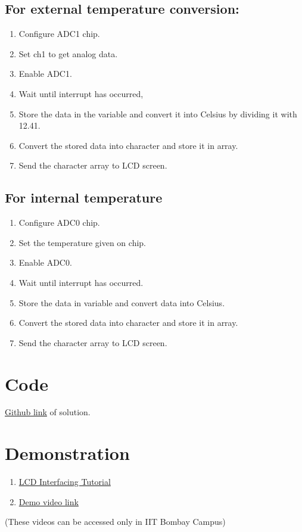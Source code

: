 \documentclass[a4paper,12pt,oneside]{book}
\begin{document}
\subsection{For external temperature conversion:}
\begin{enumerate}
\item Configure ADC1 chip.
\item Set ch1 to get analog data.
\item Enable ADC1. 
\item Wait until interrupt has occurred,
\item Store the data in the variable and convert it into Celsius by dividing it with 12.41.
\item Convert the stored data into character and store it in array.
\item Send the character array to LCD screen.
\end{enumerate}

\subsection{For internal temperature}
\begin{enumerate}
\item Configure ADC0 chip.
\item Set the temperature given on chip.
\item Enable ADC0.
\item Wait until interrupt has occurred.
\item Store the data in variable and convert data into Celsius.
\item Convert the stored data into character and store it in array.
\item Send the character array to LCD screen.
\end{enumerate}



\section{Code}
\href{https://github.com/eYSIP-2016/eYSIP-2016-Around-the-world-of-Embedded-Systems/blob/origin/master/Solutions/lab5solution/lab5_solution.c}{Github link} of solution.




\section {Demonstration}
\begin{enumerate}
\item \href{ http://10.129.139.139/videos/Interfacing_LCD_TIVA_Launchpad.html}{LCD Interfacing Tutorial}
\item \href{http://10.129.139.139/videos/Lab5.html}{Demo video link}
\end{enumerate}
(These videos can be accessed only in IIT Bombay Campus)
\newpage
\end{document}
